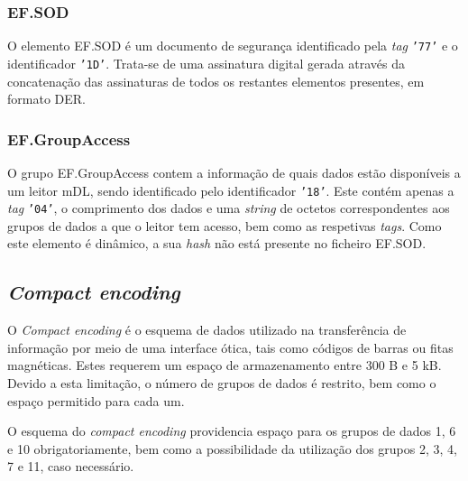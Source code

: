 \begin{table}[H]
\centering
{}\end{table}

\subsubsection{EF.SOD}

O elemento EF.SOD é um documento de segurança identificado pela \textit{tag} \texttt{'77'} e o identificador \texttt{'1D'}. Trata-se de uma assinatura digital gerada através da concatenação das assinaturas de todos os restantes elementos presentes, em formato DER. 

\subsubsection{EF.GroupAccess}

O grupo EF.GroupAccess contem a informação de quais dados estão disponíveis a um leitor mDL, sendo identificado pelo identificador \texttt{'18'}. Este contém apenas a \textit{tag} \texttt{'04'}, o comprimento dos dados e uma \textit{string} de octetos correspondentes aos grupos de dados a que o leitor tem acesso, bem como as respetivas \textit{tags}. Como este elemento é dinâmico, a sua \textit{hash} não está presente no ficheiro EF.SOD.

\subsection{\textit{Compact encoding}}

O \textit{Compact encoding} é o esquema de dados utilizado na transferência de informação por meio de uma interface ótica, tais como códigos de barras ou fitas magnéticas. Estes requerem um espaço de armazenamento entre 300 B e 5 kB. Devido a esta limitação, o número de grupos de dados é restrito, bem como o espaço permitido para cada um.

O esquema do \textit{compact encoding} providencia espaço para os grupos de dados 1, 6 e 10 obrigatoriamente, bem como a possibilidade da utilização dos grupos 2, 3, 4, 7 e 11, caso necessário.
